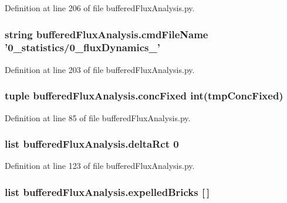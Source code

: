 Definition at line 206 of file buffered\-Flux\-Analysis.\-py.

\hypertarget{namespacebuffered_flux_analysis_af2f4a5ec3f690f7a60ea69a5cb208359}{
\subsubsection[{cmd\-File\-Name}]{\setlength{\rightskip}{0pt plus 5cm}string buffered\-Flux\-Analysis.\-cmd\-File\-Name '0\-\_\-statistics/0\-\_\-flux\-Dynamics\-\_\-'}}\label{namespacebuffered_flux_analysis_af2f4a5ec3f690f7a60ea69a5cb208359}


Definition at line 203 of file buffered\-Flux\-Analysis.\-py.

\hypertarget{namespacebuffered_flux_analysis_a532dc433988bcc35543c129c92aa9e53}{
\subsubsection[{conc\-Fixed}]{\setlength{\rightskip}{0pt plus 5cm}tuple buffered\-Flux\-Analysis.\-conc\-Fixed int(tmp\-Conc\-Fixed)}}\label{namespacebuffered_flux_analysis_a532dc433988bcc35543c129c92aa9e53}


Definition at line 85 of file buffered\-Flux\-Analysis.\-py.

\hypertarget{namespacebuffered_flux_analysis_ad074bf5da40fa7fb7978db66744aec56}{
\subsubsection[{delta\-Rct}]{\setlength{\rightskip}{0pt plus 5cm}list buffered\-Flux\-Analysis.\-delta\-Rct 0}}\label{namespacebuffered_flux_analysis_ad074bf5da40fa7fb7978db66744aec56}


Definition at line 123 of file buffered\-Flux\-Analysis.\-py.

\hypertarget{namespacebuffered_flux_analysis_abb64e6cc33529d672b220bca854fcc5c}{
\subsubsection[{expelled\-Bricks}]{\setlength{\rightskip}{0pt plus 5cm}list buffered\-Flux\-Analysis.\-expelled\-Bricks \mbox{[}$\,$\mbox{]}}}\label{namespacebuffered_flux_analysis_abb64e6cc33529d672b220bca854fcc5c}


